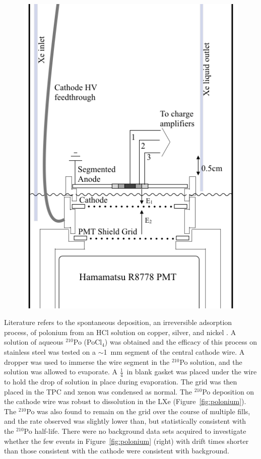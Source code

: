 \begin{figure}[htbp]
\begin{center}
\includegraphics[width=\textwidth]{figures/testbed/internals1.png}
\caption{}
\label{fig:extraction_tpc}
\end{center}
\end{figure}


Literature refers to the spontaneous deposition, an irreversible adsorption process, of polonium from an HCl solution on copper, silver, and nickel \cite{Hashimoto1990} \cite{Figgins1961}. A solution of aqueous $^{210}$Po (PoCl$_{4}$) was obtained and the efficacy of this process on stainless steel was tested on a $\sim$1~mm segment of the central cathode wire. A dropper was used to immerse the wire segment in the $^{210}$Po solution, and the solution was allowed to evaporate. A $\frac{1}{4}$~in blank gasket was placed under the wire to hold the drop of solution in place during evaporation. The grid was then placed in the \ac{TPC} and xenon was condensed as normal. The $^{210}$Po deposition on the cathode wire was robust to dissolution in the \ac{LXe} (Figure~\ref{fig:polonium}). The $^{210}$Po was also found to remain on the grid over the course of multiple fills, and the rate observed was slightly lower than, but statistically consistent with the $^{210}$Po half-life. There were no background data sets acquired to investigate whether the few events in Figure~\ref{fig:polonium} (right) with drift times shorter than those consistent with the cathode were consistent with background. 

